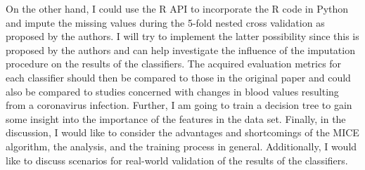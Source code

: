 \documentclass[12pt,a4paper,oneside]{article}
\newcommand{\comment}[1]{}
\begin{document}
On the other hand, I could use the R API to incorporate the R code in Python and impute the missing values during the 5-fold nested cross validation as proposed by the authors. I will try to implement the latter possibility since this is proposed by the authors and can help investigate the influence of the imputation procedure on the results of the classifiers.
The acquired evaluation metrics for each classifier should then be compared to those in the original paper and could also be compared to studies concerned with changes in blood values resulting from a coronavirus infection. Further, I am going to train a decision tree to gain some insight into the importance of the features in the data set. Finally, in the discussion, I would like to consider the advantages and shortcomings of the MICE algorithm, the analysis, and the training process in general. Additionally, I would like to discuss scenarios for real-world validation of the results of the classifiers.
\comment{
Additionally, I could discuss further ideas, such as the potential benefits and pitfalls of bootstrapping data using the original data set to improve the performance of the classifiers and scenarios for a real-world validation of the results.}
\printbibliography
\end{document}
